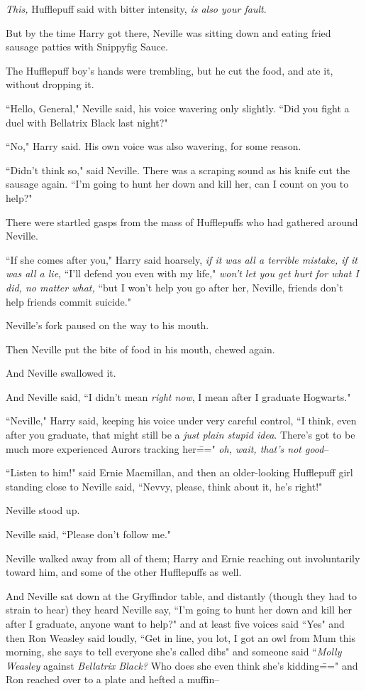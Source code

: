 \emph{This,} Hufflepuff said with bitter intensity, \emph{is also your fault}.

But by the time Harry got there, Neville was sitting down and eating fried sausage patties with Snippyfig Sauce.

The Hufflepuff boy's hands were trembling, but he cut the food, and ate it, without dropping it.

``Hello, General," Neville said, his voice wavering only slightly. ``Did you fight a duel with Bellatrix Black last night?"

``No," Harry said. His own voice was also wavering, for some reason.

``Didn't think so," said Neville. There was a scraping sound as his knife cut the sausage again. ``I'm going to hunt her down and kill her, can I count on you to help?"

There were startled gasps from the mass of Hufflepuffs who had gathered around Neville.

``If she comes after you," Harry said hoarsely, \emph{if it was all a terrible mistake, if it was all a lie}, ``I'll defend you even with my life," \emph{won't let you get hurt for what I did, no matter what,} ``but I won't help you go after her, Neville, friends don't help friends commit suicide."

Neville's fork paused on the way to his mouth.

Then Neville put the bite of food in his mouth, chewed again.

And Neville swallowed it.

And Neville said, ``I didn't mean \emph{right now}, I mean after I graduate Hogwarts."

``Neville," Harry said, keeping his voice under very careful control, ``I think, even after you graduate, that might still be a \emph{just plain stupid idea}. There's got to be much more experienced Aurors tracking her\===" \emph{oh, wait, that's not good}\---

``Listen to him!" said Ernie Macmillan, and then an older-looking Hufflepuff girl standing close to Neville said, ``Nevvy, please, think about it, he's right!"

Neville stood up.

Neville said, ``Please don't follow me."

Neville walked away from all of them; Harry and Ernie reaching out involuntarily toward him, and some of the other Hufflepuffs as well.

And Neville sat down at the Gryffindor table, and distantly (though they had to strain to hear) they heard Neville say, ``I'm going to hunt her down and kill her after I graduate, anyone want to help?" and at least five voices said ``Yes" and then Ron Weasley said loudly, ``Get in line, you lot, I got an owl from Mum this morning, she says to tell everyone she's called dibs" and someone said ``\emph{Molly Weasley} against \emph{Bellatrix Black?} Who does she even think she's kidding\===" and Ron reached over to a plate and hefted a muffin\---

